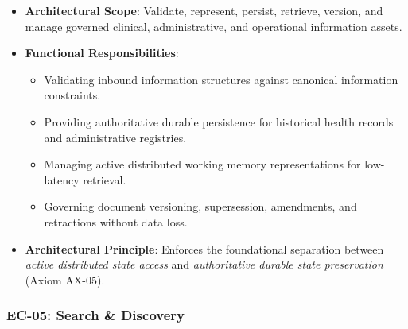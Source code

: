 \begin{itemize}

\item
\textbf{Architectural Scope}: Validate, represent, persist, retrieve, version, and manage governed clinical, administrative, and operational information assets.



\item
\textbf{Functional Responsibilities}:


\begin{itemize}

\item
Validating inbound information structures against canonical information constraints.



\item
Providing authoritative durable persistence for historical health records and administrative registries.



\item
Managing active distributed working memory representations for low-latency retrieval.



\item
Governing document versioning, supersession, amendments, and retractions without data loss.



\end{itemize}


\item
\textbf{Architectural Principle}: Enforces the foundational separation between \emph{active distributed state access} and \emph{authoritative durable state preservation} (Axiom AX-05).



\end{itemize}
\label{rad:enterprise:139}
\subsubsection*{EC-05: Search \& Discovery}
\label{rad:enterprise:140}


